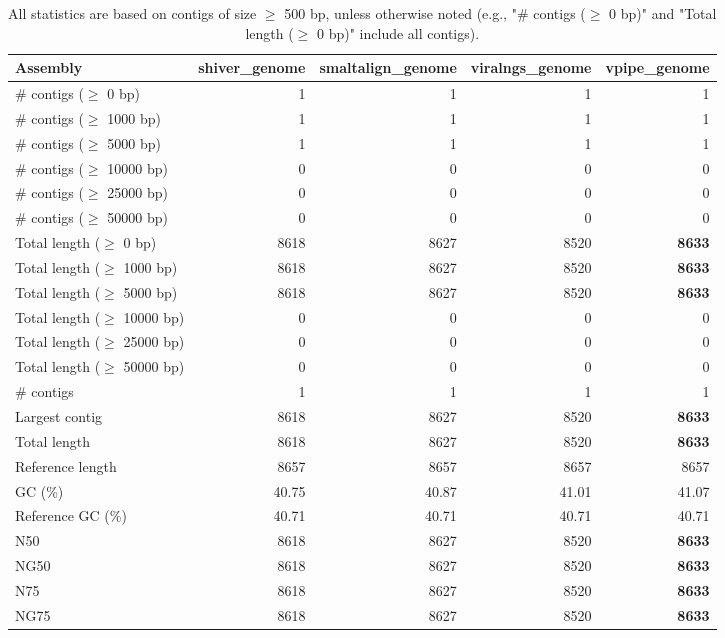 \documentclass[12pt,a4paper]{article}
\begin{document}
\begin{table}[ht]
\begin{center}
\caption{All statistics are based on contigs of size $\geq$ 500 bp, unless otherwise noted (e.g., "\# contigs ($\geq$ 0 bp)" and "Total length ($\geq$ 0 bp)" include all contigs).}
\begin{tabular}{|l*{4}{|r}|}
\hline
Assembly & shiver\_genome & smaltalign\_genome & viralngs\_genome & vpipe\_genome \\ \hline
\# contigs ($\geq$ 0 bp) & 1 & 1 & 1 & 1 \\ \hline
\# contigs ($\geq$ 1000 bp) & 1 & 1 & 1 & 1 \\ \hline
\# contigs ($\geq$ 5000 bp) & 1 & 1 & 1 & 1 \\ \hline
\# contigs ($\geq$ 10000 bp) & 0 & 0 & 0 & 0 \\ \hline
\# contigs ($\geq$ 25000 bp) & 0 & 0 & 0 & 0 \\ \hline
\# contigs ($\geq$ 50000 bp) & 0 & 0 & 0 & 0 \\ \hline
Total length ($\geq$ 0 bp) & 8618 & 8627 & 8520 & {\bf 8633} \\ \hline
Total length ($\geq$ 1000 bp) & 8618 & 8627 & 8520 & {\bf 8633} \\ \hline
Total length ($\geq$ 5000 bp) & 8618 & 8627 & 8520 & {\bf 8633} \\ \hline
Total length ($\geq$ 10000 bp) & 0 & 0 & 0 & 0 \\ \hline
Total length ($\geq$ 25000 bp) & 0 & 0 & 0 & 0 \\ \hline
Total length ($\geq$ 50000 bp) & 0 & 0 & 0 & 0 \\ \hline
\# contigs & 1 & 1 & 1 & 1 \\ \hline
Largest contig & 8618 & 8627 & 8520 & {\bf 8633} \\ \hline
Total length & 8618 & 8627 & 8520 & {\bf 8633} \\ \hline
Reference length & 8657 & 8657 & 8657 & 8657 \\ \hline
GC (\%) & 40.75 & 40.87 & 41.01 & 41.07 \\ \hline
Reference GC (\%) & 40.71 & 40.71 & 40.71 & 40.71 \\ \hline
N50 & 8618 & 8627 & 8520 & {\bf 8633} \\ \hline
NG50 & 8618 & 8627 & 8520 & {\bf 8633} \\ \hline
N75 & 8618 & 8627 & 8520 & {\bf 8633} \\ \hline
NG75 & 8618 & 8627 & 8520 & {\bf 8633} \\ \hline

\end{tabular}
\end{center}
\end{table}
\end{document}
